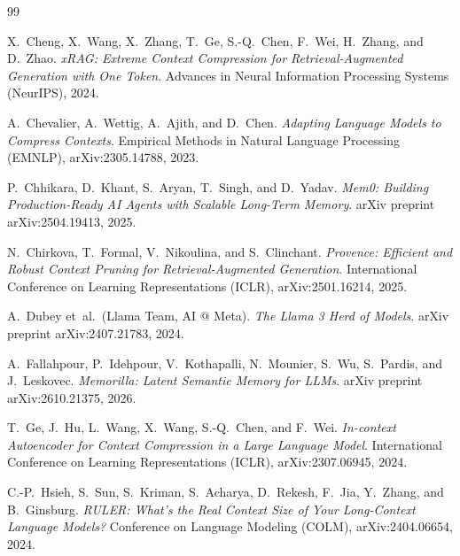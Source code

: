 \documentclass[11pt]{article}
\renewcommand{\_}{\origunderscore\allowbreak}
\begin{document}

\begin{thebibliography}{99}

X.~Cheng, X.~Wang, X.~Zhang, T.~Ge, S.-Q.~Chen, F.~Wei, H.~Zhang, and D.~Zhao.
\newblock \textit{xRAG: Extreme Context Compression for Retrieval-Augmented Generation with One Token}.
\newblock Advances in Neural Information Processing Systems (NeurIPS), 2024.

A.~Chevalier, A.~Wettig, A.~Ajith, and D.~Chen.
\newblock \textit{Adapting Language Models to Compress Contexts}.
\newblock Empirical Methods in Natural Language Processing (EMNLP), arXiv:2305.14788, 2023.

P.~Chhikara, D.~Khant, S.~Aryan, T.~Singh, and D.~Yadav.
\newblock \textit{Mem0: Building Production-Ready AI Agents with Scalable Long-Term Memory}.
\newblock arXiv preprint arXiv:2504.19413, 2025.

N.~Chirkova, T.~Formal, V.~Nikoulina, and S.~Clinchant.
\newblock \textit{Provence: Efficient and Robust Context Pruning for Retrieval-Augmented Generation}.
\newblock International Conference on Learning Representations (ICLR), arXiv:2501.16214, 2025.

A.~Dubey et~al.\ (Llama Team, AI @ Meta).
\newblock \textit{The Llama 3 Herd of Models}.
\newblock arXiv preprint arXiv:2407.21783, 2024.

A.~Fallahpour, P.~Idehpour, V.~Kothapalli, N.~Mounier, S.~Wu, S.~Pardis, and J.~Leskovec.
\newblock \textit{Memorilla: Latent Semantic Memory for LLMs}.
\newblock arXiv preprint arXiv:2610.21375, 2026.

T.~Ge, J.~Hu, L.~Wang, X.~Wang, S.-Q.~Chen, and F.~Wei.
\newblock \textit{In-context Autoencoder for Context Compression in a Large Language Model}.
\newblock International Conference on Learning Representations (ICLR), arXiv:2307.06945, 2024.

C.-P.~Hsieh, S.~Sun, S.~Kriman, S.~Acharya, D.~Rekesh, F.~Jia, Y.~Zhang, and B.~Ginsburg.
\newblock \textit{RULER: What's the Real Context Size of Your Long-Context Language Models?}
\newblock Conference on Language Modeling (COLM), arXiv:2404.06654, 2024.


\end{thebibliography}
\end{document}
